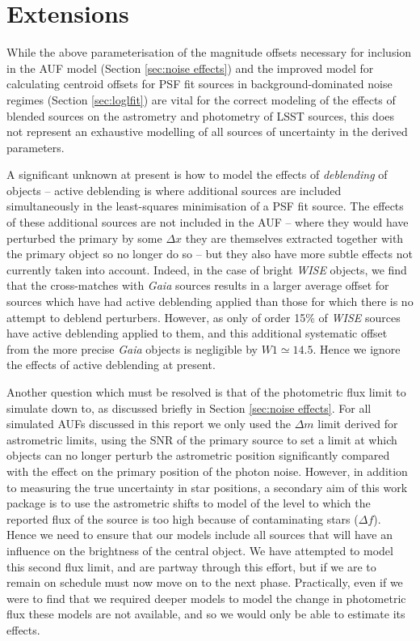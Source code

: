 \documentclass[fleqn,usenatbib]{mnras}
\begin{document}
\section{Extensions}
\label{sec:extension}
While the above parameterisation of the magnitude offsets necessary for inclusion in the AUF model (Section \ref{sec:noise effects}) and the improved model for calculating centroid offsets for PSF fit sources in background-dominated noise regimes (Section \ref{sec:loglfit}) are vital for the correct modeling of the effects of blended sources on the astrometry and photometry of LSST sources, this does not represent an exhaustive modelling of all sources of uncertainty in the derived parameters.

A significant unknown at present is how to model the effects of \textit{deblending} of objects -- active deblending is where additional sources are included simultaneously in the least-squares minimisation of a PSF fit source. 
The effects of these additional sources are not included in the AUF -- where they would have perturbed the primary by some $\Delta x$ they are themselves extracted together with the primary object so no longer do so -- but they also have more subtle effects not currently taken into account. Indeed, in the case of bright \textit{WISE} objects, we find that the cross-matches with \textit{Gaia} sources results in a larger average offset for sources which have had active deblending applied than those for which there is no attempt to deblend perturbers. However, as only of order 15\% of \textit{WISE} sources have active deblending applied to them, and this additional systematic offset from the more precise \textit{Gaia} objects is negligible by $W1\simeq14.5$.
Hence we ignore the effects of active deblending at present.

Another question which must be resolved is that of the photometric flux limit to simulate down to, as discussed briefly in Section \ref{sec:noise effects}. For all simulated AUFs discussed in this report we only used the $\Delta m$ limit derived for astrometric limits, using the SNR of the primary source to set a limit at which objects can no longer perturb the astrometric position significantly compared with the effect on the primary position of the photon noise. 
However, in addition to measuring the true uncertainty in star positions, a secondary aim of this work package is to use the astrometric shifts to model of the level to which the reported flux of the source is too high because of contaminating stars ($\Delta f$).
Hence we need to ensure that our models include all sources that will have an influence on the brightness of the central object. 
We have attempted to model this second flux limit, and are partway through this effort, but if we are to remain on schedule must now move on to the next phase.
Practically, even if we were to find that we required deeper models to model the change in photometric flux these models are not available, and so we would only be able to estimate its effects.
\end{document}
